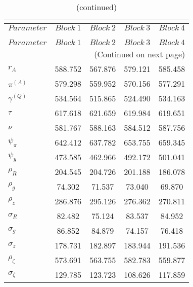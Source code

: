  
\begin{center}
\begin{longtable}{lcccc} 
\caption{MCMC Inefficiency factors per block}\\
 \label{Table:MCMC_inefficiency_factors}\\
\toprule 
$Parameter         $	 & 	 $     Block~1$	 & 	 $     Block~2$	 & 	 $     Block~3$	 & 	 $     Block~4$\\
\midrule \endfirsthead 
\caption{(continued)}\\
 \toprule \\ 
$Parameter         $	 & 	 $     Block~1$	 & 	 $     Block~2$	 & 	 $     Block~3$	 & 	 $     Block~4$\\
\midrule \endhead 
\midrule \multicolumn{5}{r}{(Continued on next page)} \\ \bottomrule \endfoot 
\bottomrule \endlastfoot 
$ {r_{A}}          $	 & 	     588.752	 & 	     567.876	 & 	     579.121	 & 	     585.458 \\ 
$ {\pi^{(A)}}      $	 & 	     579.298	 & 	     559.952	 & 	     570.156	 & 	     577.291 \\ 
$ {\gamma^{(Q)}}   $	 & 	     534.564	 & 	     515.865	 & 	     524.490	 & 	     534.163 \\ 
$ {\tau}           $	 & 	     617.618	 & 	     621.659	 & 	     619.984	 & 	     619.651 \\ 
$ {\nu}            $	 & 	     581.767	 & 	     588.163	 & 	     584.512	 & 	     587.756 \\ 
$ {\psi_\pi}       $	 & 	     642.412	 & 	     637.782	 & 	     653.755	 & 	     659.345 \\ 
$ {\psi_y}         $	 & 	     473.585	 & 	     462.966	 & 	     492.172	 & 	     501.041 \\ 
$ {\rho_R}         $	 & 	     204.545	 & 	     204.726	 & 	     201.188	 & 	     186.078 \\ 
$ {\rho_{g}}       $	 & 	      74.302	 & 	      71.537	 & 	      73.040	 & 	      69.870 \\ 
$ {\rho_z}         $	 & 	     286.876	 & 	     295.126	 & 	     276.362	 & 	     270.811 \\ 
$ {\sigma_R}       $	 & 	      82.482	 & 	      75.124	 & 	      83.537	 & 	      84.952 \\ 
$ {\sigma_{g}}     $	 & 	      86.852	 & 	      84.879	 & 	      74.157	 & 	      76.418 \\ 
$ {\sigma_z}       $	 & 	     178.731	 & 	     182.897	 & 	     183.944	 & 	     191.536 \\ 
$ {\rho_\zeta}     $	 & 	     573.691	 & 	     563.755	 & 	     582.783	 & 	     559.877 \\ 
$ {\sigma_\zeta}   $	 & 	     129.785	 & 	     123.723	 & 	     108.626	 & 	     117.859 \\ 
\end{longtable}
 \end{center}
